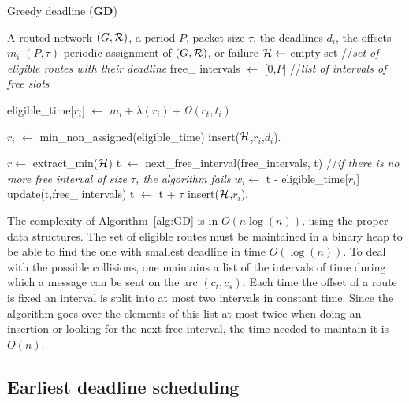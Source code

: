 \documentclass[a4paper,10pt]{article}
\begin{document}
      \begin{algorithm}\label{alg:GD}
     \caption{ Greedy deadline ({\bf GD}) }
     \begin{algorithmic}
     \REQUIRE A routed network $(G,{\cal R})$, a period $P$, packet size $\tau$, the deadlines $d_i$, the offsets $m_i$
     \ENSURE $(P,\tau)$-periodic assignment of $(G,{\cal R})$, or failure
    \STATE  ${\cal H} \leftarrow$ empty set //{\em set of eligible routes with their deadline}
        \STATE  free\_ intervals $\leftarrow$ [0,$P$] //{\em list of intervals of free slots}
   
     \STATE  eligible\_time[$r_i$] $\leftarrow$ $m_{i} +  \lambda(r_i) + \Omega(c_t,t_i)$
       \ENDFOR
       
       \STATE $r_i$ $\leftarrow $ min\_non\_assigned(eligible\_time)
       \STATE insert(${\cal H}$,$r_i$,$d_i$).
       \ENDIF
      
       \STATE $r \leftarrow $ extract\_min(${\cal H}$)
       \STATE t $\leftarrow$ next\_free\_interval(free\_intervals, t) //{\em if there is no more free interval of size $\tau$, the algorithm fails}
       \STATE $w_i \leftarrow$ t - eligible\_time[$r_i$]
       \STATE update(t,free\_ intervals)
       \STATE t $\leftarrow$ t + $\tau$
 \STATE insert(${\cal H}$,$r_i$).
       \ENDFOR
       \ENDWHILE
     \end{algorithmic}
     \end{algorithm}


    The complexity of Algorithm~\ref{alg:GD} is in $O(n\log(n))$, using the proper data structures.
    The set of eligible routes must be maintained in a binary heap
    to be able to find the one with smallest deadline in time $O(\log(n))$. 
    To deal with the possible collisions, one maintains a list of the intervals
    of time during which a message can be sent on the arc $(c_t,c_s)$. Each time the offset of a 
    route is fixed an interval is split into at most two intervals in constant time. 
    Since the algorithm goes over the elements of this list at most twice when doing an insertion
    or looking for the next free interval, the time needed to maintain it is $O(n)$. 
  
     \subsection{Earliest deadline scheduling}\label{sec:braheuristic}
     
\end{document}
